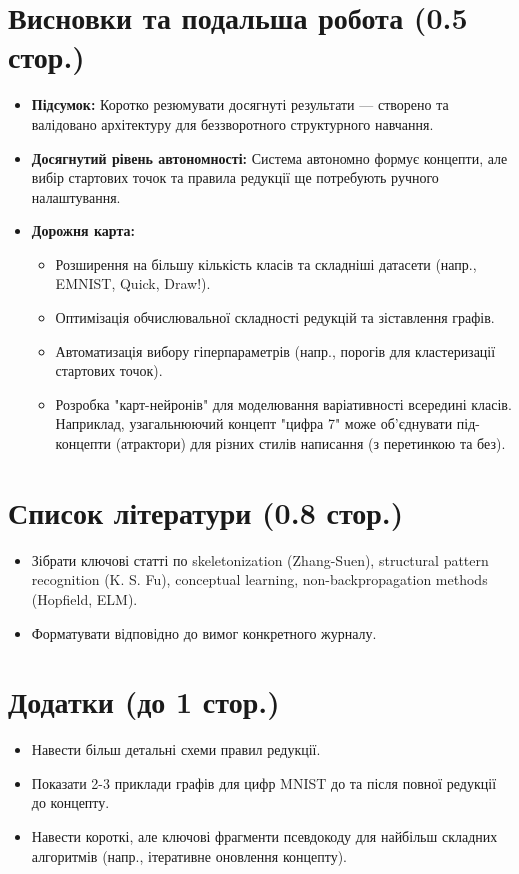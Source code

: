 \documentclass[12pt, a4paper]{article}
\begin{document}
\section{Висновки та подальша робота (0.5 стор.)}
\begin{itemize}
    \item \textbf{Підсумок:} Коротко резюмувати досягнуті результати — створено та валідовано архітектуру для беззворотного структурного навчання.
    \item \textbf{Досягнутий рівень автономності:} Система автономно формує концепти, але вибір стартових точок та правила редукції ще потребують ручного налаштування.
    \item \textbf{Дорожня карта:}
    \begin{itemize}
        \item Розширення на більшу кількість класів та складніші датасети (напр., EMNIST, Quick, Draw!).
        \item Оптимізація обчислювальної складності редукцій та зіставлення графів.
        \item Автоматизація вибору гіперпараметрів (напр., порогів для кластеризації стартових точок).
        \item Розробка "карт-нейронів" для моделювання варіативності всередині класів. Наприклад, узагальнюючий концепт "цифра 7" може об'єднувати під-концепти (атрактори) для різних стилів написання (з перетинкою та без).
    \end{itemize}
\end{itemize}

\section{Список літератури (0.8 стор.)}
\begin{itemize}
    \item Зібрати ключові статті по skeletonization (Zhang-Suen), structural pattern recognition (K. S. Fu), conceptual learning, non-backpropagation methods (Hopfield, ELM).
    \item Форматувати відповідно до вимог конкретного журналу.
\end{itemize}

\section{Додатки (до 1 стор.)}
\begin{itemize}
    \item Навести більш детальні схеми правил редукції.
    \item Показати 2-3 приклади графів для цифр MNIST до та після повної редукції до концепту.
    \item Навести короткі, але ключові фрагменти псевдокоду для найбільш складних алгоритмів (напр., ітеративне оновлення концепту).
\end{itemize}
\end{document}
